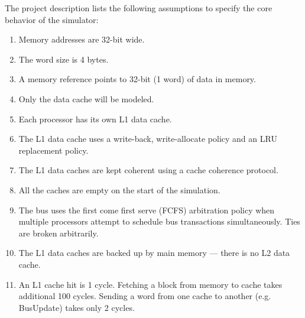 The project description lists the following assumptions to specify the core
behavior of the simulator:
\begin{enumerate}
    \item Memory addresses are 32-bit wide.
    \item The word size is 4 bytes.
    \item A memory reference points to 32-bit (1 word) of data in memory.
    \item Only the data cache will be modeled.
    \item Each processor has its own L1 data cache.
    \item The L1 data cache uses a write-back, write-allocate policy and an LRU
          replacement policy.
    \item The L1 data caches are kept coherent using a cache coherence protocol.
    \item All the caches are empty on the start of the simulation.
    \item The bus uses the first come first serve (FCFS) arbitration policy when
          multiple processors attempt to schedule bus transactions simultaneously. Ties
          are broken arbitrarily.
    \item The L1 data caches are backed up by main memory --- there is no L2 data
          cache.
    \item An L1 cache hit is 1 cycle. Fetching a block from memory to cache takes
          additional 100 cycles. Sending a word from one cache to another (e.g.
          BusUpdate) takes only 2 cycles.
\end{enumerate}


